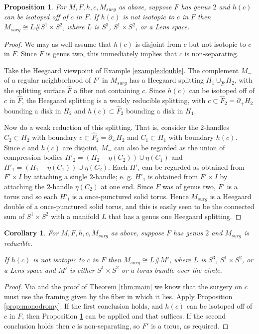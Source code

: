 \documentclass{amsart}
\newtheorem{cor}[thm]{Corollary}
\newtheorem{prop}[thm]{Proposition}
\newcommand{\bdd}{\mbox{$\partial$}}
\begin{document}
\begin{prop}  \label{prop:nonisotopic} For $M, F, h, c, M_{surg}$ as above, suppose $F$ has genus $2$ and $h(c)$ can be isotoped off of $c$ in $F$.
If $h(c)$ is not isotopic to $c$ in $F$ then $M_{surg} \cong L \# S^1 \times S^2$, where $L$ is $S^3$, $S^1 \times S^2$, or a Lens space.
\end{prop}

\begin{proof}  We may as well assume that $h(c)$ is disjoint from $c$ but not isotopic to $c$ in $F$.  Since $F$ is genus two, this  immediately implies that $c$ is non-separating.

Take the Heegaard viewpoint of Example \ref{example:double}. The complement $M_-$ of a regular neighborhood of  $F'$ in $M_{surg}$ has a Heegaard splitting $H_1 \cup_{\hat{F}} H_2$, with the splitting surface $\hat{F}$ a fiber not containing $c$.  Since $h(c)$ can be isotoped off of $c$ in $\hat{F}$, the Heegaard splitting is a weakly reducible splitting, with $c \subset \hat{F}_2 = \bdd_+ H_2$ bounding a disk in $H_2$ and $h(c) \subset \hat{F}_2$ bounding a disk in $H_1$.

Now do a weak reduction of this splitting.  That is, consider the $2$-handles $C_2 \subset H_2$ with boundary $c \subset \hat{F}_2 = \bdd_+ H_2$ and $C_1 \subset H_1$ with boundary $h(c)$. Since $c$ and $h(c)$ are disjoint, $M_-$ can also be regarded as the union of compression bodies $H'_2 = (H_2 - \eta(C_2)) \cup \eta(C_1)$ and $H'_1 = (H_1 - \eta(C_1)) \cup \eta(C_2)$.  Each $H'_i$ can be regarded as obtained from $F' \times I$ by attaching a single $2$-handle; e. g. $H'_1$ is obtained from $F' \times I$ by attaching the $2$-handle $\eta(C_2)$ at one end.  Since $F$ was of genus two, $F'$ is a torus and so each $H'_i$ is a once-punctured solid torus.  Hence $M_{surg}$ is a Heegaard double of a once-punctured solid torus, and this is easily seen to be the connected sum of $S^1 \times S^2$ with a manifold $L$ that has a genus one Heegaard splitting.  \end{proof}

\begin{cor}  \label{cor:nonisotopic} For $M, F, h, c, M_{surg}$ as above, suppose $F$ has genus $2$ and $M_{surg}$  is reducible.

If $h(c)$ is not isotopic to $c$ in $F$ then $M_{surg} \cong L \# M'$, where $L$ is $S^3$, $S^1 \times S^2$, or a Lens space and $M'$ is either $S^1 \times S^2$ or a torus bundle over the circle.
\end{cor}
\begin{proof}  Via \cite[Corollary 4.2]{ST} and the proof of Theorem \ref{thm:main} we know that the surgery on $c$ must use the framing given by the fiber in which it lies.  Apply Proposition \ref{prop:monodromy}.  If the first conclusion holds, and $h(c)$ can be isotoped off of $c$ in $F$, then  Proposition \ref{prop:nonisotopic} can be applied and that suffices.  If the second conclusion holds then $c$ is non-separating, so $F'$ is a torus, as required. \end{proof}
\end{document}
